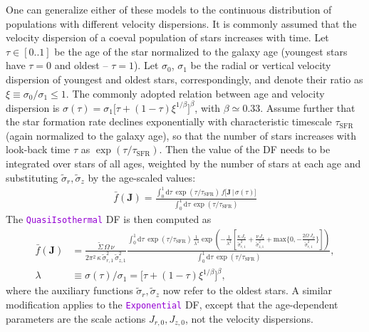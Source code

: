 \documentclass[12pt]{article}
\newcommand{\ttt}[1]{\textcolor{darkviolet}{\texttt{#1}}}
\newcommand{\D}{\mathrm{d}}
\newcommand{\bJ}{\boldsymbol{J}}
\begin{document}
One can generalize either of these models to the continuous distribution of populations with different velocity dispersions. It is commonly assumed that the velocity dispersion of a coeval population of stars increases with time. Let $\tau\in[0..1]$ be the age of the star normalized to the galaxy age (youngest stars have $\tau=0$ and oldest -- $\tau=1$). Let $\sigma_0$, $\sigma_1$ be the radial or vertical velocity dispersion of youngest and oldest stars, correspondingly, and denote their ratio as $\xi\equiv \sigma_0/\sigma_1 \le 1$. The commonly adopted relation between age and velocity dispersion \cite{AumerBinney2009} is $\sigma(\tau) = \sigma_1 \big[\tau + (1-\tau)\xi^{1/\beta} \big]^\beta$, with $\beta\simeq 0.33$. Assume further that the star formation rate declines exponentially with characteristic timescale $\tau_\mathrm{SFR}$ (again normalized to the galaxy age), so that the number of stars increases with look-back time $\tau$ as $\exp(\tau/\tau_\mathrm{SFR})$. Then the value of the DF needs to be integrated over stars of all ages, weighted by the number of stars at each age and substituting $\tilde\sigma_r, \tilde\sigma_z$ by the age-scaled values:
\begin{align*}
\bar f(\bJ) = \frac{\int_0^1 \D\tau\, \exp(\tau/\tau_\mathrm{SFR})\,
f\big[ \bJ \,|\, \sigma(\tau) \big] }{\int_0^1 \D\tau\, \exp(\tau/\tau_\mathrm{SFR})}
\end{align*}
The \ttt{QuasiIsothermal} DF is then computed as
\begin{align*}
\bar f(\bJ) &= \frac{\tilde\Sigma\,\Omega\,\nu}
{2\pi^2\,\kappa\,\tilde\sigma_{r,1}^2\,\tilde\sigma_{z,1}^2}
\frac{ \displaystyle \int_0^1 \D\tau\, \exp(\tau/\tau_\mathrm{SFR})\,
\frac{1}{\lambda^4} \exp\left(-\frac{1}{\lambda^2}
\left[ \frac{\kappa\,J_r}{\tilde\sigma_{r,1}^2} + \frac{\nu\,J_z}{\tilde\sigma_{z,1}^2} +
\mathrm{max}\bigg\{0, -\frac{2\Omega\,J_\phi}{\tilde\sigma_{r,1}^2}\bigg\} \right]\right)}
{ \int_0^1 \D\tau\, \exp(\tau/\tau_\mathrm{SFR}) } ,\\
\lambda &\equiv \sigma(\tau)/\sigma_1 = \big[\tau + (1-\tau)\xi^{1/\beta}\big]^\beta ,
\end{align*}
where the auxiliary functions $\tilde\sigma_r,\tilde\sigma_z$ now refer to the oldest stars. A similar modification applies to the \ttt{Exponential} DF, except that the age-dependent parameters are the scale actions $J_{r,0}, J_{z,0}$, not the velocity dispersions.

%
\end{document}
